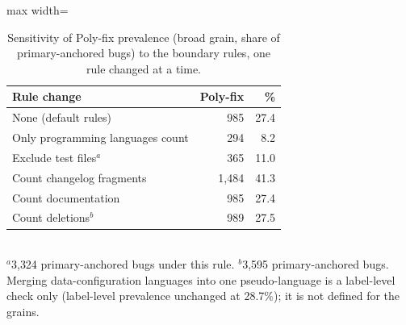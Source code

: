 \begin{table}[t]
\caption{Sensitivity of Poly-fix prevalence (broad grain, share of primary-anchored bugs) to the boundary rules, one rule changed at a time.}
\label{tab:sensitivity}
\small
\begin{adjustbox}{max width=\linewidth}\begin{tabular}{lrr}
\toprule
Rule change & Poly-fix & \% \\
\midrule
None (default rules) & 985 & 27.4 \\
Only programming languages count & 294 & 8.2 \\
Exclude test files$^{a}$ & 365 & 11.0 \\
Count changelog fragments & 1{,}484 & 41.3 \\
Count documentation & 985 & 27.4 \\
Count deletions$^{b}$ & 989 & 27.5 \\
\bottomrule
\end{tabular}\end{adjustbox}
\\[2pt]{\footnotesize $^{a}$3{,}324 primary-anchored bugs under this rule. $^{b}$3{,}595 primary-anchored bugs. Merging data-configuration languages into one pseudo-language is a label-level check only (label-level prevalence unchanged at 28.7\%); it is not defined for the grains.}
\end{table}
